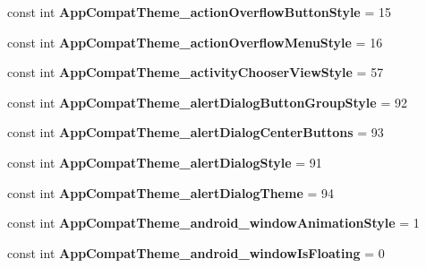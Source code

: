 \begin{DoxyCompactItemize}
const int {\bfseries App\+Compat\+Theme\+\_\+action\+Overflow\+Button\+Style} = 15
\item 
\mbox{\label{classXaria_1_1Resource_1_1Styleable_a21b2983e57bf6655cf60801db29bf36f}} 
const int {\bfseries App\+Compat\+Theme\+\_\+action\+Overflow\+Menu\+Style} = 16
\item 
\mbox{\label{classXaria_1_1Resource_1_1Styleable_a2455b843dff51a9579056aaadf491930}} 
const int {\bfseries App\+Compat\+Theme\+\_\+activity\+Chooser\+View\+Style} = 57
\item 
\mbox{\label{classXaria_1_1Resource_1_1Styleable_a1eaff631702eb64dfd46f30092dd0de6}} 
const int {\bfseries App\+Compat\+Theme\+\_\+alert\+Dialog\+Button\+Group\+Style} = 92
\item 
\mbox{\label{classXaria_1_1Resource_1_1Styleable_ab345383f6ed186f89e59f534a54a7c6d}} 
const int {\bfseries App\+Compat\+Theme\+\_\+alert\+Dialog\+Center\+Buttons} = 93
\item 
\mbox{\label{classXaria_1_1Resource_1_1Styleable_a65629955a3269b68ef83e2b429c57a60}} 
const int {\bfseries App\+Compat\+Theme\+\_\+alert\+Dialog\+Style} = 91
\item 
\mbox{\label{classXaria_1_1Resource_1_1Styleable_a58b713445cae4355fd3dc435c113c882}} 
const int {\bfseries App\+Compat\+Theme\+\_\+alert\+Dialog\+Theme} = 94
\item 
\mbox{\label{classXaria_1_1Resource_1_1Styleable_aebe0b5d1a7728d55c44ae1b9325e6152}} 
const int {\bfseries App\+Compat\+Theme\+\_\+android\+\_\+window\+Animation\+Style} = 1
\item 
\mbox{\label{classXaria_1_1Resource_1_1Styleable_adec3fd4f4a94ac12a3154cfb9dfa9f72}} 
const int {\bfseries App\+Compat\+Theme\+\_\+android\+\_\+window\+Is\+Floating} = 0
\item 
\mbox{\label{classXaria_1_1Resource_1_1Styleable_a19ab3368e65ac0fc3f2ccde1167415d6}} 

\end{DoxyCompactItemize}
